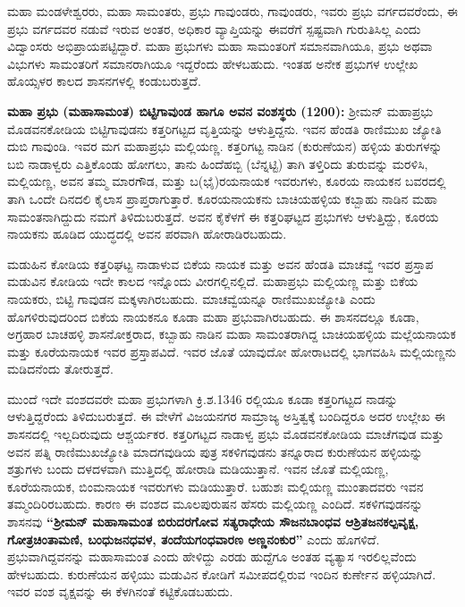 ಮಹಾ ಮಂಡಳೇಶ್ವರರು, ಮಹಾ ಸಾಮಂತರು, ಪ್ರಭು ಗಾವುಂಡರು, ಗಾವುಂಡರು, ಇವರು ಪ್ರಭು ವರ್ಗದವರೆಂದು, ಈ ಪ್ರಭು ವರ್ಗದವರ ನಡುವೆ ಇರುವ ಅಂತರ, ಅಧಿಕಾರ ವ್ಯಾಪ್ತಿಯನ್ನು ಈವರೆಗೆ ಸ್ಪಷ್ಟವಾಗಿ ಗುರುತಿಸಿಲ್ಲ ಎಂದು ವಿದ್ವಾಂಸರು ಅಭಿಪ್ರಾಯಪಟ್ಟಿದ್ದಾರೆ. ಮಹಾ ಪ್ರಭುಗಳು ಮಹಾ ಸಾಮಂತರಿಗೆ ಸಮಾನವಾಗಿಯೂ, ಪ್ರಭು ಅಥವಾ ವಿಭುಗಳು ಸಾಮಂತರಿಗೆ ಸಮಾನರಾಗಿಯೂ ಇದ್ದರೆಂದು ಹೇಳಬಹುದು. ಇಂತಹ ಅನೇಕ ಪ್ರಭುಗಳ ಉಲ್ಲೇಖ ಹೊಯ್ಸಳರ ಕಾಲದ ಶಾಸನಗಳಲ್ಲಿ ಕಂಡುಬರುತ್ತದೆ.

\textbf{ಮಹಾ ಪ್ರಭು (ಮಹಾಸಾಮಂತ) ಬಿಟ್ಟಿಗಾವುಂಡ ಹಾಗೂ ಅವನ ವಂಶಸ್ಥರು (1200):} ಶ‍್ರೀಮನ್​ ಮಹಾಪ್ರಭು ಮೊಡವನಕೋಡಿಯ ಬಿಟ್ಟಿಗಾವುಡನು ಕತ್ತರಿಗಟ್ಟದ ವೃತ್ತಿಯನ್ನು ಆಳುತ್ತಿದ್ದನು. ಇವನ ಹೆಂಡತಿ ರಾಣಿಮುಖ ಜ್ಯೋತಿ \hbox{ದುಬಿ} ಗಾವುಂಡಿ. ಇವರ ಮಗ ಮಹಾಪ್ರಭು ಮಲ್ಲಿಯಣ್ಣ. ಕತ್ತರಿಗಟ್ಟ ನಾಡಿನ (ಕುರುಣೆಯನ) ಹಳ್ಳಿಯ ತುರುಗಳನ್ನು ಬಬಿ ನಾಡಾಳ್ವರು ಎತ್ತಿಕೊಂಡು ಹೋಗಲು, ತಾನು ಹಿಂದೆಹಬ್ಬಿ (ಬೆನ್ನಟ್ಟಿ) ತಾಗಿ ತಳ್ತಿರಿದು ತುರುವನ್ನು ಮರಳಿಸಿ, ಮಲ್ಲಿಯಣ್ಣ, ಅವನ ತಮ್ಮ ಮಾರಗೌಡ, ಮತ್ತು ಬ(ಭೈ)ರಯನಾಯಕ ಇವರುಗಳು, ಕೂರಯ ನಾಯಕನ ಬವರದಲ್ಲಿ ತಾಗಿ ಒಂದೇ ದಿನದಲಿ ಕೈಲಾಸ ಪ್ರಾಪ್ತರಾಗುತ್ತಾರೆ. ಕೂರಯನಾಯಕನು ಬಾಚಿಯಹಳ್ಳಿಯ ಕಬ್ಬಾಹು ನಾಡಿನ ಮಹಾ ಸಾಮಂತನಾಗಿದ್ದುದು ನಮಗೆ ತಿಳಿದುಬರುತ್ತದೆ. ಅವನ ಕೈಕೆಳಗೆ ಈ ಕತ್ತರಿಘಟ್ಟದ ಪ್ರಭುಗಳು ಆಳುತ್ತಿದ್ದು, ಕೂರಯ ನಾಯಕನು ಹೂಡಿದ ಯುದ್ಧದಲ್ಲಿ ಅವನ ಪರವಾಗಿ ಹೋರಾಡಿರಬಹುದು.

ಮಡುಹಿನ ಕೋಡಿಯ ಕತ್ತರಿಘಟ್ಟ ನಾಡಾಳುವ ಬಿಕೆಯ ನಾಯಕ ಮತ್ತು ಅವನ ಹೆಂಡತಿ ಮಾಚವ್ವೆ ಇವರ ಪ್ರಸ್ತಾಪ ಮಡುವಿನ ಕೋಡಿಯ ಇದೇ ಕಾಲದ ಇನ್ನೊಂದು ವೀರಗಲ್ಲಿನಲ್ಲಿದೆ. ಮಹಾಪ್ರಭು ಮಲ್ಲಿಯಣ್ಣ ಮತ್ತು ಬಿಕೆಯ ನಾಯಕರು, ಬಿಟ್ಟಿ ಗಾವುಡನ ಮಕ್ಕಳಾಗಿರಬಹುದು. ಮಾಚವ್ವೆಯನ್ನೂ ರಾಣಿಮುಖಜ್ಯೋತಿ ಎಂದು ಹೊಗಳಿರುವುದರಿಂದ ಬಿಕೆಯ ನಾಯಕನೂ ಕೂಡಾ ಮಹಾ ಪ್ರಭುವಾಗಿರಬಹುದು. ಈ ಶಾಸನದಲ್ಲೂ ಕೂಡಾ, ಅಗ್ರಹಾರ ಬಾಚಹಳ್ಳಿ ಶಾಸನೋಕ್ತರಾದ, ಕಬ್ಬಾಹು ನಾಡಿನ ಮಹಾ ಸಾಮಂತರಾಗಿದ್ದ ಬಾಚಿಯಹಳ್ಳಿಯ ಮಲ್ಲೆಯನಾಯಕ ಮತ್ತು ಕೂರೆಯನಾಯಕ ಇವರ ಪ್ರಸ್ತಾಪವಿದೆ. ಇವರ ಜೊತೆ ಯಾವುದೋ ಹೋರಾಟದಲ್ಲಿ ಭಾಗವಹಿಸಿ ಮಲ್ಲಿಯಣ್ಣನು ಮಡಿದನೆಂದು ತೋರುತ್ತದೆ.

ಮುಂದೆ ಇದೇ ವಂಶದವರೇ ಮಹಾ ಪ್ರಭುಗಳಾಗಿ ಕ್ರಿ.ಶ.1346 ರಲ್ಲಿಯೂ ಕೂಡಾ ಕತ್ತರಿಗಟ್ಟದ ನಾಡನ್ನು ಆಳುತ್ತಿದ್ದರೆಂದು ತಿಳಿದುಬರುತ್ತದೆ. ಈ ವೇಳೆಗೆ ವಿಜಯನಗರ ಸಾಮ್ರಾಜ್ಯ ಅಸ್ತಿತ್ವಕ್ಕೆ ಬಂದಿದ್ದರೂ ಅದರ ಉಲ್ಲೇಖ ಈ ಶಾಸನದಲ್ಲಿ ಇಲ್ಲದಿರುವುದು ಆಶ್ಚರ್ಯಕರ. ಕತ್ತರಿಗಟ್ಟದ ನಾಡಾಳ್ವ ಪ್ರಭು ಮೊಡವನಕೋಡಿಯ ಮಾಚೆಗವುಡ ಮತ್ತು ಅವನ ಪತ್ನಿ ರಾಣಿಮುಖಜ್ಯೋತಿ ಮಾದಗವುಡಿಯ ಪುತ್ರ ಸಕಳಿಗವುಡನು ತನ್ನೂರಾದ ಕುರುಣೆಯನ ಹಳ್ಳಿಯನ್ನು ಶತ್ರುಗಳು ಬಂದು ದಳದಳವಾಗಿ ಮುತ್ತಿದಲ್ಲಿ ಹೋರಾಡಿ ಮಡಿಯುತ್ತಾನೆ. ಇವನ ಜೊತೆ ಮಲ್ಲಿಯಣ್ಣ, ಕೂರೆಯನಾಯಕ, ಬಿಂಮನಾಯಕ ಇವರುಗಳು ಮಡಿಯುತ್ತಾರೆ. ಬಹುಶಃ ಮಲ್ಲಿಯಣ್ಣ ಮುಂತಾದವರು ಇವನ ತಮ್ಮಂದಿರಿರಬಹುದು. ಕಾರಣ ಈ ವಂಶದ ಮೂಲಪುರುಷನ ಹೆಸರು ಮಲ್ಲಿಯಣ್ಣ ಎಂದಿದೆ. ಸಕಳಿಗವುಡನನ್ನು ಶಾಸನವು \textbf{“ಶ‍್ರೀಮನ್ ಮಹಾಸಾಮಂತ ಬಿರುದರಗೋವ ಸತ್ಯರಾಧೇಯ ಸೌಜನಬಾಂಧವ ಆಶ್ರಿತಜನಕಲ್ಪವೃಕ್ಷ, ಗೋತ್ರಚಿಂತಾಮಣಿ, ಬಂಧುಜನಧವಳ, ತಂದೆಯಗಂಧವಾರಣ\general{\break } ಅಣ್ಣನಂಕುರ”} ಎಂದು ಹೊಗಳಿದೆ. ಪ್ರಭುವಾಗಿದ್ದವನನ್ನು ಮಹಾಸಾಮಂತ ಎಂದು ಹೇಳಿದ್ದು ಎರಡು ಹುದ್ದೆಗೂ ಅಂತಹ ವ್ಯತ್ಯಾಸ ಇರಲಿಲ್ಲವೆಂದು ಹೇಳಬಹುದು. ಕುರುಣೆಯನ ಹಳ್ಳಿಯು ಮಡುವಿನ ಕೋಡಿಗೆ ಸಮೀಪದಲ್ಲಿರುವ ಇಂದಿನ ಕುರ್ಣೇನ ಹಳ್ಳಿಯಾಗಿದೆ. ಇವರ ವಂಶ ವೃಕ್ಷವನ್ನು ಈ ಕೆಳಗಿನಂತೆ ಕಟ್ಟಿಕೊಡಬಹುದು.

